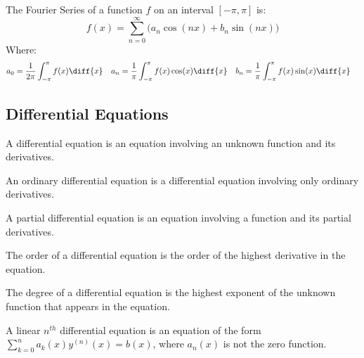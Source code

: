 \documentclass[crop=false,class=article,oneside]{standalone}
\begin{document}
        \begin{definition}
            The Fourier Series of a function $f$ on an interval $[-\pi,\pi]$
            is:
            \begin{equation*}
                f(x)=\sum_{n=0}^{\infty}\Big(a_{n}\cos(nx)+b_{n}\sin(nx)\Big)
            \end{equation*}
            Where:
            \begin{align*}
                a_{0}&=\frac{1}{2\pi}\int_{-\pi}^{\pi}f(x)\diff{x}
                &
                a_{n}&=\frac{1}{\pi}\int_{-\pi}^{\pi}f(x)\cos(x)\diff{x}
                &
                b_{n}&=\frac{1}{\pi}\int_{-\pi}^{\pi}f(x)\sin(x)\diff{x}
            \end{align*}
        \end{definition}
    \subsection{Differential Equations}
        \begin{definition}
            A differential equation is an equation involving an unknown
            function and its derivatives.
        \end{definition}
        \begin{definition}
            An ordinary differential equation is a differential
            equation involving only ordinary derivatives.
        \end{definition}
        \begin{definition}
            A partial differential equation is an equation involving
            a function and its partial derivatives.
        \end{definition}
        \begin{definition}
            The order of a differential equation is the order
            of the highest derivative in the equation.
        \end{definition}
        \begin{definition}
            The degree of a differential equation is the highest exponent
            of the unknown function that appears in the equation.
        \end{definition}
        \begin{definition}
            A linear $n^{th}$ differential equation is an equation of the
            form $\sum_{k=0}^{n}a_{k}(x)y^{(n)}(x)=b(x)$, where
            $a_{n}(x)$ is not the zero function.
        \end{definition}
\end{document}
